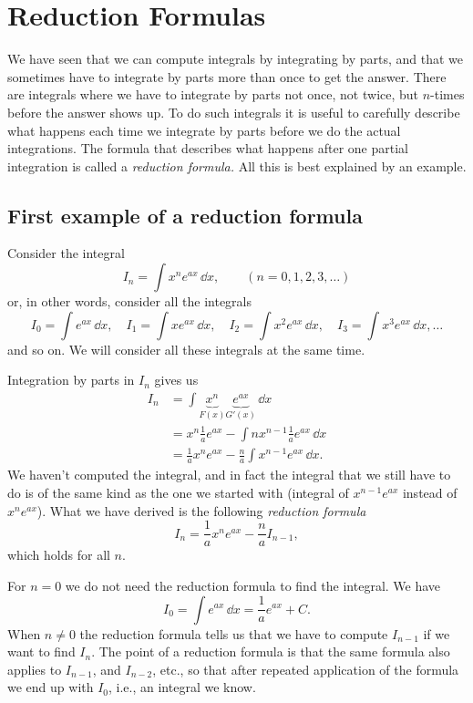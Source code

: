 \section{Reduction Formulas}\label{sec:reduction-formulas} %
We have seen that we can compute integrals by integrating by parts, and that we
sometimes have to integrate by parts more than once to get the answer.  There
are integrals where we have to integrate by parts not once, not twice, but
$n$-times before the answer shows up.  To do such integrals it is useful to
carefully describe what happens each time we integrate by parts before we do the
actual integrations.  The formula that describes what happens after one partial
integration is called a \emph{reduction formula.}  All this is best explained by
an example.


\subsection{First example of a reduction formula} Consider the integral %
\[
I_n = \int x^n e^{ax}\,\dd x, \qquad (n=0,1,2,3,\ldots)
\]
or, in other words, consider all the integrals
\[
I_0 = \int e^{ax}\,\dd x, \quad I_1 = \int xe^{ax}\, \dd x, \quad I_2 = \int
x^2e^{ax}\, \dd x, \quad I_3 = \int x^3e^{ax}\, \dd x, \ldots
\]
and so on.  We will consider all these integrals at the same time.

Integration by parts in $I_n$ gives us
\begin{align*}
  I_n &= \int \underbrace{x^n}_{F(x)} \underbrace{e^{ax}}_{G'(x)} \,\dd x\\
  &= x^n\frac1ae^{ax} -\int nx^{n-1}\frac1a e^{ax}\,\dd x \\
  &= \frac 1a x^n e^{ax} - \frac na \int x^{n-1}e^{ax}\,\dd x.
\end{align*}
We haven't computed the integral, and in fact the integral that we still have to
do is of the same kind as the one we started with (integral of $x^{n-1}e^{ax}$
instead of $x^ne^{ax}$). What we have derived is the following \emph{reduction
  formula}
\[
I_n = \frac 1a x^n e^{ax} - \frac na I_{n-1},
\]
which holds for all $n$.

For $n=0$ we do not need the reduction formula to find the integral.  We have
\[
I_0 = \int e^{ax}\,\dd x = \frac{1} {a} e^{ax} +C.
\]
When $n\neq0$ the reduction formula tells us that we have to compute $I_{n-1}$
if we want to find $I_n$. The point of a reduction formula is that the same
formula also applies to $I_{n-1}$, and $I_{n-2}$, etc., so that after repeated
application of the formula we end up with $I_0$, i.e., an integral we know.

